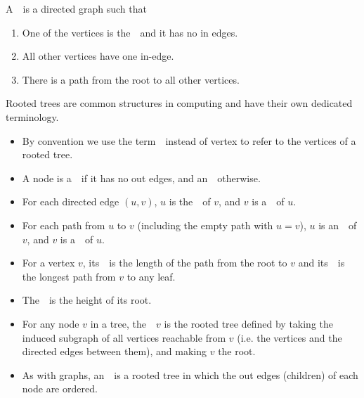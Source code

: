 \begin{definition}
\label{def:bg::graphs::rooted-tree}

A~~is a directed graph such that
\begin{enumerate}
\item 
One of the vertices is the~~and it has no in edges.
\item 
All other vertices have one in-edge.
\item
There is a path from the root to all other vertices.
\end{enumerate}

Rooted trees are common structures in computing and have their own
dedicated terminology.
%
\begin{itemize}
\item
By convention we use the term~~instead of vertex to refer
to the vertices of a rooted tree.  
%
\item
A node is a~~if it has no out edges, and an~~otherwise.  
%

\item
For each directed edge $(u,v)$, $u$ is the~~of $v$, and
$v$ is a~~of $u$.  
%

\item
For each path from $u$ to $v$ (including the empty path with $u = v$),
$u$ is an~~of $v$, and $v$ is a~~of
$u$.
%
\item
For a vertex $v$, its~~is the length of the path from the
root to $v$ and its~~is the longest path from $v$ to any
leaf.  
%

\item
The~~is the height of its root.  
%

\item
For any node $v$ in a tree, the~~$v$ is the
rooted tree defined by taking the induced subgraph of all vertices
reachable from $v$ (i.e. the vertices and the directed edges between
them), and making $v$ the root.  
%

\item
As with graphs, an~~is a rooted tree in
which the out edges (children) of each node are ordered.
\end{itemize}
\end{definition}

